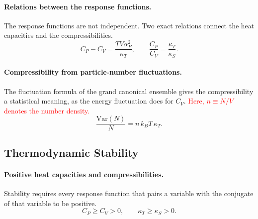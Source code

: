 \paragraph{Relations between the response functions.}
The response functions are not independent. Two exact relations connect
the heat capacities and the compressibilities.
\begin{equation}
    \boxed{C_P-C_V=\frac{TV\alpha_P^2}{\kappa_T},\qquad
    \frac{C_P}{C_V}=\frac{\kappa_T}{\kappa_S}.}
\end{equation}

\paragraph{Compressibility from particle-number fluctuations.}
The fluctuation formula of the grand canonical ensemble gives the
compressibility a statistical meaning, as the energy fluctuation does for
$C_V$. \textcolor{red}{Here, $n\equiv N/V$ denotes the number density.}
\begin{equation}
    \boxed{\frac{\mathrm{Var}(N)}{N}=n\,k_BT\,\kappa_T.}
\end{equation}

\subsection{Thermodynamic Stability}

\paragraph{Positive heat capacities and compressibilities.}
Stability requires every response function that pairs a variable with the
conjugate of that variable to be positive.
\begin{equation}
    \boxed{C_P\geq C_V>0,\qquad\kappa_T\geq\kappa_S>0.}
\end{equation}

